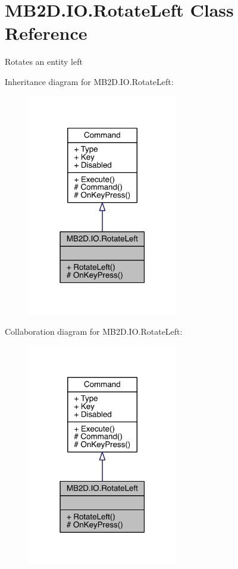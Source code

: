 \hypertarget{class_m_b2_d_1_1_i_o_1_1_rotate_left}{}\section{M\+B2\+D.\+I\+O.\+Rotate\+Left Class Reference}
\label{class_m_b2_d_1_1_i_o_1_1_rotate_left}


Rotates an entity left  




Inheritance diagram for M\+B2\+D.\+I\+O.\+Rotate\+Left\+:\nopagebreak
\begin{figure}[H]
\begin{center}
\leavevmode
\includegraphics[width=186pt]{class_m_b2_d_1_1_i_o_1_1_rotate_left__inherit__graph}
\end{center}
\end{figure}


Collaboration diagram for M\+B2\+D.\+I\+O.\+Rotate\+Left\+:\nopagebreak
\begin{figure}[H]
\begin{center}
\leavevmode
\includegraphics[width=186pt]{class_m_b2_d_1_1_i_o_1_1_rotate_left__coll__graph}
\end{center}
\end{figure}
